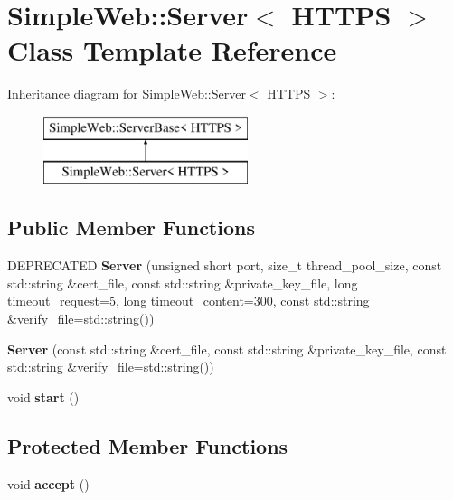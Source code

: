 \hypertarget{a00269}{}\section{Simple\+Web\+:\+:Server$<$ H\+T\+T\+PS $>$ Class Template Reference}
\label{a00269}
Inheritance diagram for Simple\+Web\+:\+:Server$<$ H\+T\+T\+PS $>$\+:\begin{figure}[H]
\begin{center}
\leavevmode
\includegraphics[height=2.000000cm]{a00269}
\end{center}
\end{figure}
\subsection*{Public Member Functions}
\begin{DoxyCompactItemize}
\item 
D\+E\+P\+R\+E\+C\+A\+T\+ED {\bfseries Server} (unsigned short port, size\+\_\+t thread\+\_\+pool\+\_\+size, const std\+::string \&cert\+\_\+file, const std\+::string \&private\+\_\+key\+\_\+file, long timeout\+\_\+request=5, long timeout\+\_\+content=300, const std\+::string \&verify\+\_\+file=std\+::string())\hypertarget{a00269_a1a5530e96cd973de3dc987034ca61b54}{}\label{a00269_a1a5530e96cd973de3dc987034ca61b54}

\item 
{\bfseries Server} (const std\+::string \&cert\+\_\+file, const std\+::string \&private\+\_\+key\+\_\+file, const std\+::string \&verify\+\_\+file=std\+::string())\hypertarget{a00269_a15bb179287dfaa18da16b8877174e8d6}{}\label{a00269_a15bb179287dfaa18da16b8877174e8d6}

\item 
void {\bfseries start} ()\hypertarget{a00269_a6a740b3fdbbbf178f540e27942cc93fc}{}\label{a00269_a6a740b3fdbbbf178f540e27942cc93fc}

\end{DoxyCompactItemize}
\subsection*{Protected Member Functions}
\begin{DoxyCompactItemize}
\item 
void {\bfseries accept} ()\hypertarget{a00269_af722d2884eafafada7073feb7793c422}{}\label{a00269_af722d2884eafafada7073feb7793c422}

\end{DoxyCompactItemize}
